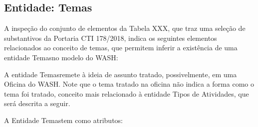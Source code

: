 \documentclass[
12pt,		%
openright,	%
twoside,  %
a4paper,			%
chapter=TITLE,		%
english,			%
french,				%
spanish,			%
brazil				%
]{USPSC-classe/USPSC}
\begin{document}
\subsection[Entidade: Temas]{Entidade: Temas}\label{Entidade: Temas}
A inspe\c{c}\~ao do conjunto de elementos da Tabela XXX, que traz uma sele\c{c}\~ao de substantivos da Portaria CTI 178/2018, indica os seguintes elementos relacionados ao conceito de \textquotedbl temas\textquotedbl , que permitem inferir a exist\^encia de uma entidade \textquotedbl Temas\textquotedbl  no modelo do WASH:















\noindent\begin{center}\mbox{\centering{}}\end{center}


A entidade \textquotedbl Temas\textquotedbl  remete \`a ideia de assunto tratado, possivelmente, em uma Oficina do WASH. Note que o tema tratado na oficina n\~ao indica a forma como o tema foi tratado, conceito mais relacionado \`a entidade \textquotedbl Tipos de Atividades\textquotedbl , que ser\'a descrita a seguir.














A Entidade \textquotedbl Temas\textquotedbl  tem como atributos:
\end{document}
